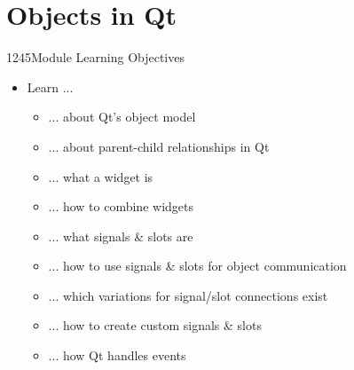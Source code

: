 %
%
%
%

\section{Objects in Qt}

\begin{slide}{1245}{Module Learning Objectives}
\begin{itemize}
\item Learn ...
  \begin{itemize}
  \item ... about Qt's object model
  \item ... about parent-child relationships in Qt
  \item ... what a widget is
  \item ... how to combine widgets
  \item ... what signals \& slots are
  \item ... how to use signals \& slots for object communication
  \item ... which variations for signal/slot connections exist
  \item ... how to create custom signals \& slots
  \item ... how Qt handles events
  \end{itemize}
\end{itemize}

\end{slide}










% 
